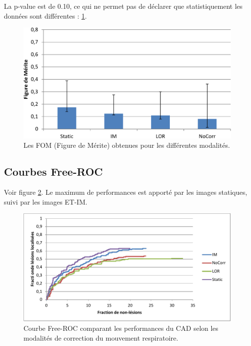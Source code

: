 La p-value est de 0.10, ce qui ne permet pas de déclarer que statistiquement les données sont différentes : \ref{lab:fom_mod19}.

\begin{figure}[h!]
 \begin{center}
   \includegraphics[width=15cm]{images/FOM_mod}
 \end{center}
 \caption{ \label{lab:fom_mod19} Les FOM (Figure de Mérite) obtenues pour les différentes modalités.}
\end{figure}

\subsection{Courbes Free-ROC}

Voir figure \ref{lab:froc_mod}.
Le maximum de performances est apporté par les images statiques, suivi par les images ET-IM.

\begin{figure}[h!]
 \begin{center}
   \includegraphics[width=15cm]{images/FROC_mod}
 \end{center}
 \caption{ \label{lab:froc_mod} Courbe Free-ROC comparant les performances du CAD selon les modalités de correction du mouvement respiratoire.}
\end{figure}


